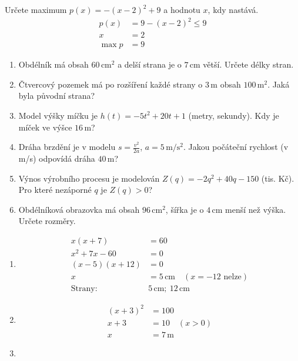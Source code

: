 \documentclass[11pt,a4paper]{article}
\begin{document}
\begin{zadaniReseniBox}[title={Rozšíření 3}]
Určete maximum $p(x)=-(x-2)^2+9$ a hodnotu $x$, kdy nastává.
\tcblower
\[\begin{aligned}
p(x)&=9-(x-2)^2\le9\\x&=2\\\max p&=9
\end{aligned}\]
\end{zadaniReseniBox}
\begin{zadaniReseniBox}[title={Domácí úkol}]
\begin{enumerate}[label=\alph*),itemsep=2pt]
\item Obdélník má obsah $60\,\mathrm{cm^2}$ a delší strana je o $7\,\mathrm{cm}$ větší. Určete délky stran.
\item Čtvercový pozemek má po rozšíření každé strany o $3\,\mathrm m$ obsah $100\,\mathrm{m^2}$. Jaká byla původní strana?
\item Model výšky míčku je $h(t)=-5t^2+20t+1$ (metry, sekundy). Kdy je míček ve výšce $16\,\mathrm m$?
\item Dráha brzdění je v modelu $s=\frac{v^2}{2a}$, $a=5\,\mathrm{m/s^2}$. Jakou počáteční rychlost (v m/s) odpovídá dráha $40\,\mathrm m$?
\item Výnos výrobního procesu je modelován $Z(q)=-2q^2+40q-150$ (tis. Kč). Pro které nezáporné $q$ je $Z(q)>0$?
\item Obdélníková obrazovka má obsah $96\,\mathrm{cm^2}$, šířka je o $4\,\mathrm{cm}$ menší než výška. Určete rozměry.
\end{enumerate}
\tcblower
\begin{enumerate}[label=\alph*),itemsep=2pt]
\item
\[\begin{aligned}
x(x+7)&=60\\[2pt]
x^2+7x-60&=0\\[2pt]
(x-5)(x+12)&=0\\[2pt]
x&=5\,\mathrm{cm}\quad (x=-12\text{ nelze})\\[2pt]
\text{Strany: }&5\,\mathrm{cm};\ 12\,\mathrm{cm}
\end{aligned}\]
\item
\[\begin{aligned}
(x+3)^2&=100\\[2pt]
x+3&=10\quad (x>0)\\[2pt]
x&=7\,\mathrm m
\end{aligned}\]
\item

\end{enumerate}
\end{zadaniReseniBox}
\end{document}
